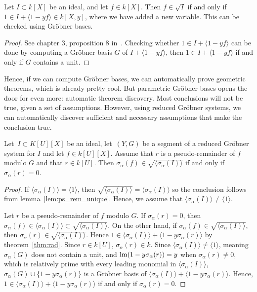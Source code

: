 \begin{theorem}\label{thm:rad}
  Let $I \subset k[X]$ be an ideal, and let $f \in k[X]$. Then $f \in \sqrt{I}$ if and only if $1 \in I + \langle 1 - yf \rangle \in k[X, y]$, where we have added a new variable. This can be checked using Gröbner bases.
\end{theorem}
\begin{proof}
  See chapter 3,  proposition 8 in~\cite{IVA}. Checking whether $1 \in I + \langle 1 - yf \rangle$ can be done by computing a Gröbner basis $G$ of $I + \langle 1 - yf \rangle$, then $1 \in I + \langle 1 - yf \rangle$ if and only if $G$ contains a unit.
\end{proof}

Hence, if we can compute Gröbner bases, we can automatically prove geometric theorems, which is already pretty cool. But parametric Gröbner bases opens the door for even more: automatic theorem discovery. Most conclusions will not be true, given a set of assumptions. However, using reduced Gröbner systems, we can automatically discover sufficient and necessary assumptions that make the conclusion true.

\begin{theorem}\label{thm:in_rad_iff_r_eq_z}
  Let $\,I \subset K[U][X]$ be an ideal, let $\,(Y, G)$ be a segment of a reduced Gröbner system for $I$ and let $f \in k[U][X]$. Assume that $r$ is a pseudo-remainder of $f$ modulo $G$ and that $r \in k[U]$. Then $\sigma_{\alpha}(f) \in \sqrt{\langle \sigma_{\alpha}(I) \rangle}$ if and only if $\sigma_{\alpha}(r) = 0$.
\end{theorem}
\begin{proof}
  If $\langle \sigma_{\alpha}(I) \rangle = \langle 1 \rangle$, then $\sqrt{\langle \sigma_{\alpha}(I) \rangle} = \langle \sigma_{\alpha}(I) \rangle$ so the conclusion follows from lemma~\ref{lem:ps_rem_unique}. Hence, we assume that $\langle \sigma_{\alpha}(I) \rangle \neq \langle 1 \rangle$.

  Let $r$ be a pseudo-remainder of $f$ modulo $G$. If $\sigma_{\alpha}(r) = 0$, then $\sigma_{\alpha}(f) \in \langle \sigma_{\alpha}(I) \rangle \subset \sqrt{\langle \sigma_{\alpha}(I) \rangle}$. On the other hand, if $\sigma_{\alpha}(f) \in \sqrt{\langle \sigma_{\alpha}(I) \rangle}$, then $\sigma_{\alpha}(r) \in \sqrt{\langle \sigma_{\alpha}(I) \rangle} $. Hence $1 \in \langle \sigma_{\alpha}(I) \rangle + \langle 1 - y \sigma_{\alpha}(r) \rangle$ by theorem~\ref{thm:rad}. Since $r \in k[U]$, $\sigma_{\alpha}(r) \in k$. Since $\langle \sigma_{\alpha}(I) \rangle \neq \langle 1 \rangle$, meaning $\sigma_{\alpha}(G)$ does not contain a unit, and $\operatorname{lm}(1 - y \sigma_{\alpha}(r)) = y$ when $\sigma_{\alpha}(r) \neq 0$, which is relatively prime with every leading monomial in $\langle \sigma_{\alpha}(I) \rangle$, $\sigma_{\alpha}(G) \cup \{1 - y \sigma_{\alpha}(r)\}$ is a Gröbner basis of $\langle \sigma_{\alpha}(I) \rangle + \langle 1 - y \sigma_{\alpha}(r) \rangle$. Hence, $1 \in \langle \sigma_{\alpha}(I) \rangle + \langle 1 - y \sigma_{\alpha}(r) \rangle$ if and only if $\sigma_{\alpha}(r) = 0$.
\end{proof}

